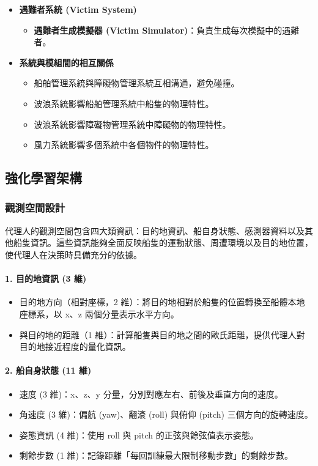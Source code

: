 \documentclass[12pt,a4paper]{article}
\begin{document}
\begin{itemize}
	 \item \textbf{遇難者系統 (Victim System)}
	\begin{itemize}
	    \item \textbf{遇難者生成模擬器 (Victim Simulator)}：負責生成每次模擬中的遇難者。
	\end{itemize}
	
	 \item \textbf{系統與模組間的相互關係}
	\begin{itemize}
	    \item 船舶管理系統與障礙物管理系統互相溝通，避免碰撞。
	    \item 波浪系統影響船舶管理系統中船隻的物理特性。
	    \item 波浪系統影響障礙物管理系統中障礙物的物理特性。
	    \item 風力系統影響多個系統中各個物件的物理特性。
	\end{itemize}

\end{itemize}

\subsection{強化學習架構}

\subsubsection{觀測空間設計}
代理人的觀測空間包含四大類資訊：目的地資訊、船自身狀態、感測器資料以及其他船隻資訊。這些資訊能夠全面反映船隻的運動狀態、周遭環境以及目的地位置，使代理人在決策時具備充分的依據。

\paragraph{1. 目的地資訊 (3 維)}
\begin{itemize}
    \item 目的地方向（相對座標，2 維）：將目的地相對於船隻的位置轉換至船體本地座標系，以 x、z 兩個分量表示水平方向。
    \item 與目的地的距離（1 維）：計算船隻與目的地之間的歐氏距離，提供代理人對目的地接近程度的量化資訊。
\end{itemize}

\paragraph{2. 船自身狀態 (11 維)}
\begin{itemize}
    \item 速度 (3 維)：x、z、y 分量，分別對應左右、前後及垂直方向的速度。
    \item 角速度 (3 維)：偏航 (yaw)、翻滾 (roll) 與俯仰 (pitch) 三個方向的旋轉速度。
    \item 姿態資訊 (4 維)：使用 roll 與 pitch 的正弦與餘弦值表示姿態。
    \item 剩餘步數 (1 維)：記錄距離「每回訓練最大限制移動步數」的剩餘步數。
\end{itemize}
\end{document}
